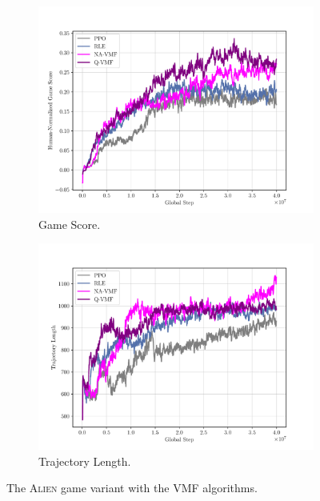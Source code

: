 \begin{figure}[H]
  \centering
  \begin{subfigure}[b]{0.49\textwidth}
    \centering
    \includegraphics[width=\textwidth]{figures/plot_Alien_VMF Human-Normalized Game Score.pdf}
    \caption{Game Score.}
    \label{fig:vmf-game-score}
  \end{subfigure}
  \hfill
  \begin{subfigure}[b]{0.49\textwidth}
    \centering
    \includegraphics[width=\textwidth]{figures/plot_Alien_VMF Trajectory Length.pdf}
    \caption{Trajectory Length.}
    \label{fig:vmf-trajectory-length}
  \end{subfigure}
  \label{fig:vmf-variant}
  \caption{The \textsc{Alien} game variant with the VMF algorithms.}
\end{figure}

